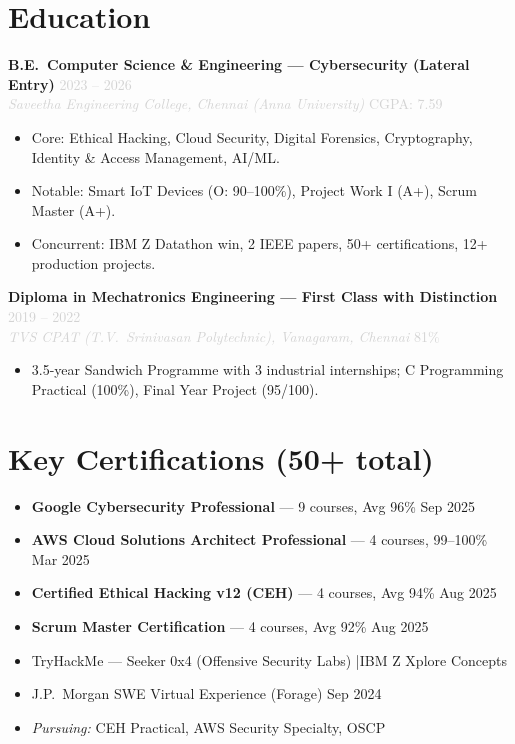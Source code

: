 \documentclass[9.5pt, letterpaper]{article}
\newcommand{\role}[4]{%
  \textbf{#1} \hfill \textcolor{lightgray}{\small #2}\\[-1pt]
  \textit{\textcolor{lightgray}{\small #3}} \hfill \textcolor{lightgray}{\small #4}}
\begin{document}
\section{Education}
\vspace{1pt}

\role{B.E.\ Computer Science \& Engineering --- Cybersecurity (Lateral Entry)}{2023 -- 2026}{Saveetha Engineering College, Chennai (Anna University)}{CGPA: 7.59}
\begin{itemize}
  \item Core: Ethical Hacking, Cloud Security, Digital Forensics, Cryptography, Identity \& Access Management, AI/ML.
  \item Notable: Smart IoT Devices (O: 90--100\%), Project Work I (A+), Scrum Master (A+).
  \item Concurrent: IBM Z Datathon win, 2 IEEE papers, 50+ certifications, 12+ production projects.
\end{itemize}
\vspace{4pt}

\role{Diploma in Mechatronics Engineering --- First Class with Distinction}{2019 -- 2022}{TVS CPAT (T.V.\ Srinivasan Polytechnic), Vanagaram, Chennai}{81\%}
\begin{itemize}
  \item 3.5-year Sandwich Programme with 3 industrial internships; C Programming Practical (100\%), Final Year Project (95/100).
\end{itemize}

\section{Key Certifications (50+ total)}
\vspace{1pt}
\begin{itemize}
  \item \textbf{Google Cybersecurity Professional} --- 9 courses, Avg 96\% \hfill Sep 2025
  \item \textbf{AWS Cloud Solutions Architect Professional} --- 4 courses, 99--100\% \hfill Mar 2025
  \item \textbf{Certified Ethical Hacking v12 (CEH)} --- 4 courses, Avg 94\% \hfill Aug 2025
  \item \textbf{Scrum Master Certification} --- 4 courses, Avg 92\% \hfill Aug 2025
  \item TryHackMe --- Seeker 0x4 (Offensive Security Labs) \enspace|\enspace IBM Z Xplore Concepts
  \item J.P.\ Morgan SWE Virtual Experience (Forage) \hfill Sep 2024
  \item \textit{Pursuing:} CEH Practical, AWS Security Specialty, OSCP
\end{itemize}
\end{document}
